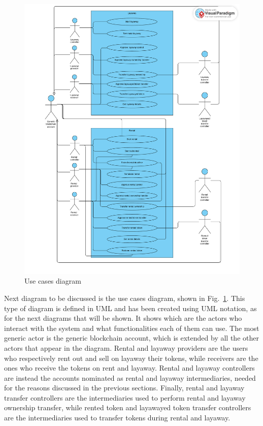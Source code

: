 \documentclass[english, LaM, oneside]{sapthesis}%
\begin{document}
\begin{figure}
    \centering
        \begin{adjustbox}{width=1\textwidth}
            \includegraphics{UseCasesDiagrams/useCaseDiagram.pdf}
        \end{adjustbox}
    \caption{Use cases diagram}
    \label{fig:UseCaseDiagram}
\end{figure}

Next diagram to be discussed is the use cases diagram, shown in Fig.~\ref{fig:UseCaseDiagram}. This type of diagram is defined in UML and has been created using UML notation, as for the next diagrams that will be shown.
It  shows which are the actors who interact with the system and what functionalities each of them can use. The most generic actor is the generic blockchain account, which is extended by all the other actors that appear in the diagram. Rental and layaway providers are the users who respectively rent out and sell on layaway their tokens, while receivers are the ones who receive the tokens on rent and layaway. Rental and layaway controllers are instead the accounts nominated as rental and layaway intermediaries, needed for the reasons discussed in the previous sections. Finally, rental and layaway transfer controllers are the intermediaries used to perform rental and layaway ownership transfer, while rented token and layawayed token transfer controllers are the intermediaries used to transfer tokens during rental and layaway.
\end{document}
